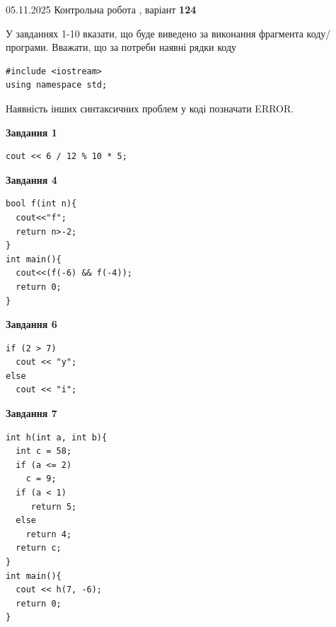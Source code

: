 \documentclass[12pt, ukrainian]{article}
\begin{document}
\newpage

{\Large{05.11.2025 Контрольна робота , варіант  \No \textbf { 124 }\par}}
{
\begin {large}
У завданнях 1-10 вказати, що буде виведено за виконання фрагмента коду/про\-гра\-ми.
Вважати, що за потреби наявні рядки коду
\begin{verbatim}
#include <iostream>
using namespace std;
\end{verbatim}
Наявність інших синтаксичних проблем у коді позначати ERROR.

\begin{minipage}[t]{7.0cm}

\begin{center}
\textbf{Завдання 1}
\end{center}
\vspace{-8mm}

\begin{verbatim}
cout << 6 / 12 % 10 * 5;
\end{verbatim}



\begin{center}
\textbf{Завдання 4}
\end{center}
\vspace{-8mm}

\begin{verbatim}
bool f(int n){
  cout<<"f";
  return n>-2;
}
int main(){
  cout<<(f(-6) && f(-4));
  return 0;
}
\end{verbatim}



\begin{center}
\textbf{Завдання 6}
\end{center}
\vspace{-8mm}

\begin{verbatim}
if (2 > 7)
  cout << "y";
else
  cout << "i";
\end{verbatim}



\begin{center}
\textbf{Завдання 7}
\end{center}
\vspace{-8mm}

\begin{verbatim}
int h(int a, int b){
  int c = 58;
  if (a <= 2)
    c = 9;
  if (a < 1)
     return 5;
  else
    return 4;
  return c;
}
int main(){
  cout << h(7, -6);
  return 0;
}
\end{verbatim}


\end{minipage}
\end{large}}
\end{document}
